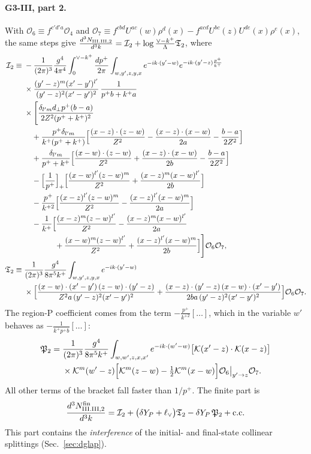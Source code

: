 \documentclass[aps,prd,onecolumn,superscriptaddress,nofootinbib,floatfix,longbibliography,11pt]{revtex4-2}
\numberwithin{equation}{section}
\newcommand{\KK}{\mathcal{K}}
\newcommand{\lV}{\ell_{\vee}}
\newcommand{\Ord}{\mathcal{O}}
\begin{document}
\paragraph*{G3-III, part 2.} With $\Ord_6\equiv f^{c'd'a}\Ord_4$ and $\Ord_7\equiv f^{cbd}U^{ac}(w)\rho^d(x)-f^{acd}U^{bc}(z)U^{de}(x)\rho^e(x)$, the same steps give $\frac{d^3N_{\rm III.III,2}}{d^3k}=\mathcal I_2+\log\frac{\vee-k^+}{\Lambda}\mathfrak T_2$, where
\begin{align}
\mathcal I_2\equiv{}&-\frac{1}{(2\pi)^3}\frac{g^4}{4\pi^4}\int_0^{\vee-k^+}\frac{dp^+}{2\pi}\int_{w,y',z,y,x}e^{-ik\cdot(y'-w)}e^{-ik\cdot(y'-z)\frac{p^+}{k^+}}\notag\\
&\times\frac{(y'-z)^m(x'-y')^{l'}}{(y'-z)^2(x'-y')^2}\,\frac{1}{p^+b+k^+a}\notag\\
&\times\Bigg[\frac{\delta_{l'm}d_\perp p^+(b-a)}{2Z^2(p^++k^+)^2}\notag\\
&\quad+\frac{p^+\delta_{l'm}}{k^+(p^++k^+)}\Big[\frac{(x-z)\cdot(z-w)}{Z^2}-\frac{(x-z)\cdot(x-w)}{2a}-\frac{b-a}{2Z^2}\Big]\notag\\
&\quad+\frac{\delta_{l'm}}{p^++k^+}\Big[\frac{(x-w)\cdot(z-w)}{Z^2}+\frac{(x-z)\cdot(x-w)}{2b}-\frac{b-a}{2Z^2}\Big]\notag\\
&\quad-\Big[\frac{1}{p^+}\Big]_+\Big[\frac{(x-w)^{l'}(z-w)^m}{Z^2}+\frac{(x-z)^m(x-w)^{l'}}{2b}\Big]\notag\\
&\quad-\frac{p^+}{k^{+2}}\Big[\frac{(x-z)^{l'}(z-w)^m}{Z^2}-\frac{(x-z)^{l'}(x-w)^m}{2a}\Big]\notag\\
&\quad-\frac{1}{k^+}\Big[\frac{(x-z)^m(z-w)^{l'}}{Z^2}-\frac{(x-z)^m(x-w)^{l'}}{2a}\notag\\
&\hspace{4em}+\frac{(x-w)^m(z-w)^{l'}}{Z^2}+\frac{(x-z)^{l'}(x-w)^m}{2b}\Big]\Bigg]\Ord_6\Ord_7,\notag\\
\mathfrak T_2\equiv{}&\frac{1}{(2\pi)^3}\frac{g^4}{8\pi^5k^+}\int_{w,y',z,y,x}e^{-ik\cdot(y'-w)}\notag\\
&\times\Big[\frac{(x-w)\cdot(x'-y')\,(z-w)\cdot(y'-z)}{Z^2a\,(y'-z)^2(x'-y')^2}+\frac{(x-z)\cdot(y'-z)\,(x-w)\cdot(x'-y')}{2ba\,(y'-z)^2(x'-y')^2}\Big]\Ord_6\Ord_7.
\label{eq:GIIIIII2}
\end{align}
The region-P coefficient comes from the term $-\frac{p^+}{k^{+2}}[\dots]$, which in the variable $w'$ behaves as $-\frac{1}{k^+p^+b}[\dots]$:
\begin{align}
\mathfrak P_2={}&\frac{1}{(2\pi)^3}\frac{g^4}{8\pi^5k^+}\int_{w,w',z,x,x'}e^{-ik\cdot(w'-w)}\big[\KK(x'-z)\cdot\KK(x-z)\big]\notag\\
&\times\KK^m(w'-z)\Big[\KK^m(z-w)-\tfrac12\KK^m(x-w)\Big]\Ord_6\big|_{y'\to z}\Ord_7 .
\end{align}
All other terms of the bracket fall faster than $1/p^+$. The finite part is
\begin{equation}
\frac{d^3N^{\rm fin}_{\rm III.III,2}}{d^3k}=\mathcal I_2+\big(\delta Y_P+\lV\big)\mathfrak T_2-\delta Y_P\,\mathfrak P_2+{\rm c.c.}
\end{equation}
This part contains the \emph{interference} of the initial- and final-state collinear splittings (Sec.~\ref{sec:dglap}).
\end{document}
